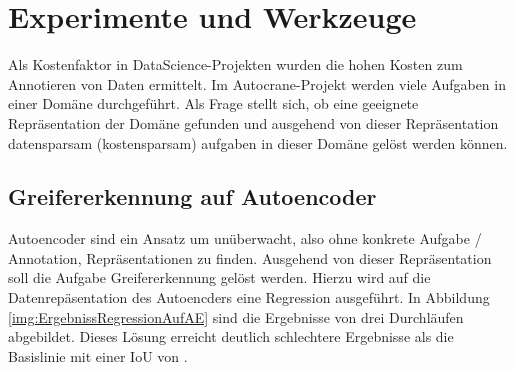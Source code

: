 
\chapter{Experimente und Werkzeuge}
\label{chap:HauptteilMultiTaskLernen}
Als Kostenfaktor in DataScience-Projekten wurden die hohen Kosten zum Annotieren von Daten ermittelt. Im Autocrane-Projekt werden viele Aufgaben in einer Domäne durchgeführt. Als Frage stellt sich, ob eine geeignete Repräsentation der Domäne gefunden und ausgehend von dieser Repräsentation datensparsam (kostensparsam) aufgaben in dieser Domäne gelöst werden können.  


	\section{Greifererkennung auf Autoencoder}
	\label{sec:GreifererkennungAufAutoencoder}
    Autoencoder sind ein Ansatz um unüberwacht, also ohne konkrete Aufgabe / Annotation, Repräsentationen zu finden. Ausgehend von dieser Repräsentation soll die  Aufgabe Greifererkennung gelöst werden. Hierzu wird auf die Datenrepäsentation des Autoencders eine Regression ausgeführt. In Abbildung \ref{img:ErgebnissRegressionAufAE} sind die Ergebnisse von drei Durchläufen abgebildet. Dieses Lösung erreicht deutlich schlechtere Ergebnisse als die Basislinie mit einer IoU von .
